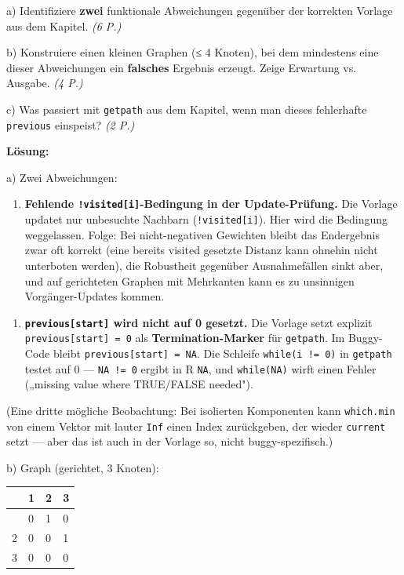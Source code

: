 \documentclass[11pt, a4paper]{article}
\begin{document}
a) Identifiziere \textbf{zwei} funktionale Abweichungen gegenüber der korrekten Vorlage aus dem Kapitel. \textit{(6 P.)}


b) Konstruiere einen kleinen Graphen (≤ 4 Knoten), bei dem mindestens eine dieser Abweichungen ein \textbf{falsches} Ergebnis erzeugt. Zeige Erwartung vs. Ausgabe. \textit{(4 P.)}


c) Was passiert mit \texttt{getpath} aus dem Kapitel, wenn man dieses fehlerhafte \texttt{previous} einspeist? \textit{(2 P.)}


\textbf{Lösung:}


a) Zwei Abweichungen:


\begin{enumerate}
  \item \textbf{Fehlende \texttt{!visited[i]}-Bedingung in der Update-Prüfung.} Die Vorlage updatet nur unbesuchte Nachbarn (\texttt{!visited[i]}). Hier wird die Bedingung weggelassen. Folge: Bei nicht-negativen Gewichten bleibt das Endergebnis zwar oft korrekt (eine bereits visited gesetzte Distanz kann ohnehin nicht unterboten werden), die Robustheit gegenüber Ausnahmefällen sinkt aber, und auf gerichteten Graphen mit Mehrkanten kann es zu unsinnigen Vorgänger-Updates kommen.
\end{enumerate}

\begin{enumerate}
  \item \textbf{\texttt{previous[start]} wird nicht auf 0 gesetzt.} Die Vorlage setzt explizit \texttt{previous[start] = 0} als \textbf{Termination-Marker} für \texttt{getpath}. Im Buggy-Code bleibt \texttt{previous[start] = NA}. Die Schleife \texttt{while(i != 0)} in \texttt{getpath} testet auf 0 — \texttt{NA != 0} ergibt in R \texttt{NA}, und \texttt{while(NA)} wirft einen Fehler („missing value where TRUE/FALSE needed").
\end{enumerate}

(Eine dritte mögliche Beobachtung: Bei isolierten Komponenten kann \texttt{which.min} von einem Vektor mit lauter \texttt{Inf} einen Index zurückgeben, der wieder \texttt{current} setzt — aber das ist auch in der Vorlage so, nicht buggy-spezifisch.)


b) Graph (gerichtet, 3 Knoten):



{\small
\begin{tabularx}{\linewidth}{XXXX}
\hline
\rowcolor{tableheadbg}
{\color{white}\textbf{}} & {\color{white}\textbf{1}} & {\color{white}\textbf{2}} & {\color{white}\textbf{3}} \\[2pt]
\hline
\endhead
\hline
\endfoot
1 & 0 & 1 & 0 \\
2 & 0 & 0 & 1 \\
3 & 0 & 0 & 0 \\
\end{tabularx}
}
\end{document}
